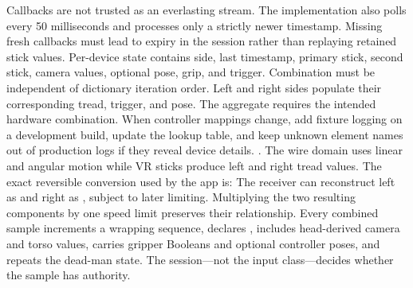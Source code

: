 {}Callbacks are not trusted as an everlasting stream. The implementation also polls  every 50 milliseconds and processes only a strictly newer timestamp. Missing fresh callbacks must lead to expiry in the session rather than replaying retained stick values.\markdownRendererInterblockSeparator
{}\markdownRendererSectionBegin
{}\markdownRendererInterblockSeparator
{}Per-device state contains side, last timestamp, primary stick, second stick, camera values, optional pose, grip, and trigger. Combination must be independent of dictionary iteration order. Left and right sides populate their corresponding tread, trigger, and pose. The aggregate  requires the intended hardware combination.\markdownRendererParagraphSeparator
{}When controller mappings change, add fixture logging on a development build, update the lookup table, and keep unknown element names out of production logs if they reveal device details.\markdownRendererInterblockSeparator
{}
\markdownRendererSectionEnd 
\markdownRendererSectionEnd \markdownRendererSectionBegin
{}\markdownRendererInterblockSeparator
{}\markdownRendererBlockQuoteBegin
{} .\markdownRendererBlockQuoteEnd \markdownRendererInterblockSeparator
{}The wire domain uses linear and angular motion while VR sticks produce left and right tread values. The exact reversible conversion used by the app is:\markdownRendererInterblockSeparator
{}\markdownRendererInterblockSeparator
{}The receiver can reconstruct left as  and right as , subject to later limiting. Multiplying the two resulting components by one speed limit preserves their relationship.\markdownRendererParagraphSeparator
{}Every combined sample increments a wrapping  sequence, declares , includes head-derived camera and torso values, carries gripper Booleans and optional controller poses, and repeats the dead-man state. The session—not the input class—decides whether the sample has authority.\markdownRendererInterblockSeparator
